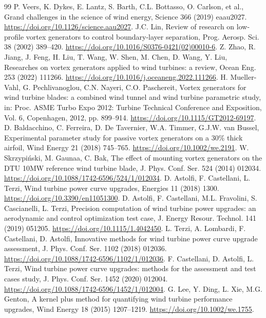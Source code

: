 \documentclass[preprint,12pt]{elsarticle}
\begin{document}
\begin{thebibliography}{99}
 P. Veers, K. Dykes, E. Lantz, S. Barth, C.L. Bottasso, O. Carlson, et al., Grand challenges in the science of wind energy, Science 366 (2019) eaau2027. \url{https://doi.org/10.1126/science.aau2027}.
 J.C. Lin, Review of research on low-profile vortex generators to control boundary-layer separation, Prog. Aerosp. Sci. 38 (2002) 389--420. \url{https://doi.org/10.1016/S0376-0421(02)00010-6}.
 Z. Zhao, R. Jiang, J. Feng, H. Liu, T. Wang, W. Shen, M. Chen, D. Wang, Y. Liu, Researches on vortex generators applied to wind turbines: a review, Ocean Eng. 253 (2022) 111266. \url{https://doi.org/10.1016/j.oceaneng.2022.111266}.
 H. Mueller-Vahl, G. Pechlivanoglou, C.N. Nayeri, C.O. Paschereit, Vortex generators for wind turbine blades: a combined wind tunnel and wind turbine parametric study, in: Proc. ASME Turbo Expo 2012: Turbine Technical Conference and Exposition, Vol. 6, Copenhagen, 2012, pp. 899--914. \url{https://doi.org/10.1115/GT2012-69197}.
 D. Baldacchino, C. Ferreira, D. De Tavernier, W.A. Timmer, G.J.W. van Bussel, Experimental parameter study for passive vortex generators on a 30\% thick airfoil, Wind Energy 21 (2018) 745--765. \url{https://doi.org/10.1002/we.2191}.
 W. Skrzypiński, M. Gaunaa, C. Bak, The effect of mounting vortex generators on the DTU 10MW reference wind turbine blade, J. Phys. Conf. Ser. 524 (2014) 012034. \url{https://doi.org/10.1088/1742-6596/524/1/012034}.
 D. Astolfi, F. Castellani, L. Terzi, Wind turbine power curve upgrades, Energies 11 (2018) 1300. \url{https://doi.org/10.3390/en11051300}.
 D. Astolfi, F. Castellani, M.L. Fravolini, S. Cascianelli, L. Terzi, Precision computation of wind turbine power upgrades: an aerodynamic and control optimization test case, J. Energy Resour. Technol. 141 (2019) 051205. \url{https://doi.org/10.1115/1.4042450}.
 L. Terzi, A. Lombardi, F. Castellani, D. Astolfi, Innovative methods for wind turbine power curve upgrade assessment, J. Phys. Conf. Ser. 1102 (2018) 012036. \url{https://doi.org/10.1088/1742-6596/1102/1/012036}.
 F. Castellani, D. Astolfi, L. Terzi, Wind turbine power curve upgrades: methods for the assessment and test cases study, J. Phys. Conf. Ser. 1452 (2020) 012004. \url{https://doi.org/10.1088/1742-6596/1452/1/012004}.
 G. Lee, Y. Ding, L. Xie, M.G. Genton, A kernel plus method for quantifying wind turbine performance upgrades, Wind Energy 18 (2015) 1207--1219. \url{https://doi.org/10.1002/we.1755}.

\end{thebibliography}
\end{document}
